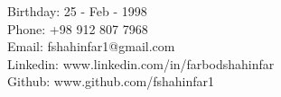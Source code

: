 {
\small
\noindent
Birthday: 25 - Feb - 1998 \\
Phone: +98 912 807 7968 \\
Email: fshahinfar1@gmail.com \\
Linkedin: www.linkedin.com/in/farbod\-shahinfar \\
Github: www.github.com/fshahinfar1 \\
}



